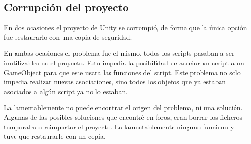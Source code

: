 \subsection{Corrupción del proyecto}

En dos ocasiones el proyecto de Unity se corrompió, de forma que la única opción fue restaurarlo con una copia de seguridad. 

En ambas ocasiones el problema fue el mismo, todos los scripts pasaban a ser inutilizables en el proyecto. Esto impedia la posibilidad de asociar un script a un GameObject para que este usara las funciones del script. Este problema no solo impedía realizar nuevas asociaciones, sino todos los objetos que ya estaban asociados a algún script ya no lo estaban.

La lamentablemente no puede encontrar el origen del problema, ni una solución. Algunas de las posibles soluciones que encontré en foros, eran borrar los ficheros temporales o reimportar el proyecto. La lamentablemente ninguno funciono y tuve que restaurarlo con un copia. 




